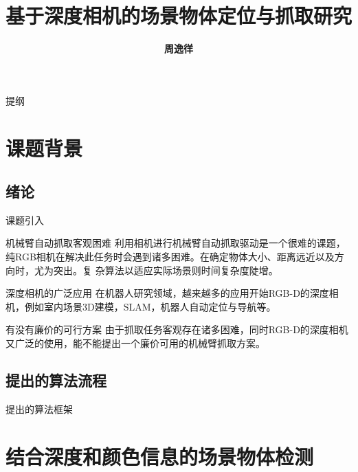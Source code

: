 \documentclass[xcolor=table,compress,blue]{beamer}
\title{\textbf{\Huge{基于深度相机的场景物体定位与抓取研究}}}
\institute{ 
	\textbf{\large{南京大学计算机科学与技术系}}
}
\author{\textbf{\huge{周逸徉}}}
\date{\tiny{}}
\begin{document}
\frame{
	\titlepage
	\thispagestyle{empty}
}
\begin{frame}[plain]{提纲}
	\vspace{-16pt}
	\textbf{\Large{\tableofcontents[hideallsubsections]}}
\end{frame}


%

\section{课题背景}
  \subsection{绪论}
	\begin{frame}{课题引入}
		\begin{exampleblock}{机械臂自动抓取客观困难}
			利用相机进行机械臂自动抓取驱动是一个很难的课题，纯RGB相机在解决此任务时会遇到诸多困难。在确定物体大小、距离远近以及方向时，尤为突出。复
			杂算法以适应实际场景则时间复杂度陡增。
		\end{exampleblock}
		\begin{exampleblock}{深度相机的广泛应用}
			在机器人研究领域，越来越多的应用开始RGB-D的深度相机，例如室内场景3D建模，SLAM，机器人自动定位与导航等。
		\end{exampleblock}
		\begin{exampleblock}{有没有廉价的可行方案}
			由于抓取任务客观存在诸多困难，同时RGB-D的深度相机又广泛的使用，能不能提出一个廉价可用的机械臂抓取方案。
		\end{exampleblock}
	\end{frame}
	\subsection{提出的算法流程}
		\begin{frame}{提出的算法框架}
		\end{frame}	
  
\section{结合深度和颜色信息的场景物体检测}
\end{document}
